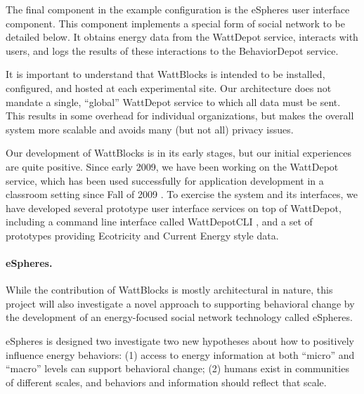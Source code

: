 The final component in the example configuration is the eSpheres user
interface component.  This component implements a special form of social
network to be detailed below. It obtains energy data from the WattDepot service,
interacts with users, and logs the results of these interactions to the
BehaviorDepot service.

It is important to understand that WattBlocks is intended to be installed,
configured, and hosted at each experimental site.  Our architecture does
not mandate a single, ``global'' WattDepot service to which all data
must be sent.  This results in some overhead for
individual organizations, but makes the overall system more scalable and
avoids many (but not all) privacy issues.


Our development of WattBlocks is in its early stages, but our initial
experiences are quite positive.  Since early 2009, we have been working on
the WattDepot service, which has been used successfully for application
development in a classroom setting since Fall of 2009 \cite{WattDepot}.  To
exercise the system and its interfaces, we have developed several prototype
user interface services on top of WattDepot, including a command line
interface called WattDepotCLI \cite{WattDepotCLI}, and a set of prototypes
providing Ecotricity \cite{Ecotricity} and Current Energy
\cite{CurrentEnergy} style data.




\paragraph{eSpheres.}

While the contribution of WattBlocks is mostly architectural in nature,
this project will also investigate a novel approach to supporting
behavioral change by the development of an energy-focused social network
technology called eSpheres.

eSpheres is designed two investigate two new hypotheses about how to
positively influence energy behaviors: (1) access to energy information at
both ``micro'' and ``macro'' levels can support behavioral change; (2)
humans exist in communities of different scales, and behaviors and
information should reflect that scale.

